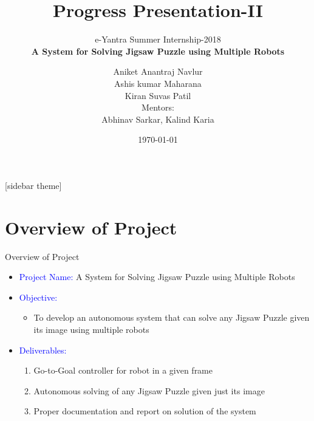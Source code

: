\documentclass[10pt,a4paper]{beamer}
\begin{document}
	\title{Progress Presentation-II}
	\subtitle{e-Yantra Summer Internship-2018 \\ $ $\textbf{A System for Solving Jigsaw Puzzle using Multiple Robots}$ $}
	\author{$ $Aniket Anantraj Navlur$ $\\$ $Ashis kumar Maharana$ $\\$ $Kiran Suvas Patil$ $\\ \vspace{1em}
	Mentors: \\$ $Abhinav Sarkar, Kalind Karia$ $}
	\date{\today}
	\frame{\titlepage}

[sidebar theme]
\section{Overview of Project}
\begin{frame}{Overview of Project}
	
	\begin{itemize}
		\item \textcolor{blue}{Project Name:} A System for Solving Jigsaw Puzzle using Multiple Robots
		\item \textcolor{blue}{Objective:}
		\begin{itemize}
			\item To develop an autonomous system that can solve any Jigsaw Puzzle given its image using multiple robots 
		\end{itemize}
		\item \textcolor{blue}{Deliverables:}
		\begin{enumerate}
			\item Go-to-Goal controller for robot in a given frame
			\item Autonomous solving of any Jigsaw Puzzle given just its image
			\item Proper documentation and report on solution of the system
		\end{enumerate}
	\end{itemize}
\end{frame}
\end{document}
